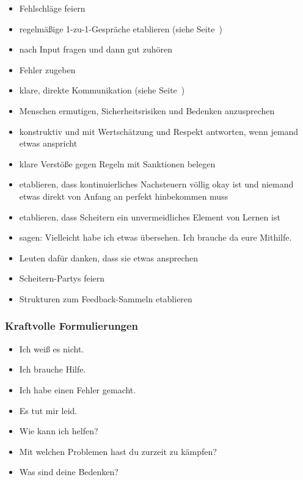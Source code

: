 \begin{itemize}
    \item Fehlschläge feiern 
    \item regelmäßige 1-zu-1-Gespräche etablieren (siehe Seite~\pageref{1-zu-1}) 
    \item nach Input fragen und dann gut zuhören  
    \item Fehler zugeben 
    \item klare, direkte Kommunikation (siehe Seite~\pageref{direkte-kommunikation}) 
    \item Menschen ermutigen, Sicherheitsrisiken und Bedenken anzusprechen
    \item konstruktiv und mit Wertschätzung und Respekt antworten, wenn jemand etwas anspricht  
    \item klare Verstöße gegen Regeln mit Sanktionen belegen  
    \item etablieren, dass kontinuierliches Nachsteuern völlig okay ist und niemand etwas direkt von Anfang an perfekt hinbekommen muss  
    \item etablieren, dass Scheitern ein unvermeidliches Element von Lernen ist 
    \item sagen: \glqq Vielleicht habe ich etwas übersehen. Ich brauche da eure Mithilfe.\grqq {}
    \item Leuten dafür danken, dass sie etwas ansprechen 
    \item Scheitern-Partys feiern 
    \item Strukturen zum Feedback-Sammeln etablieren 
\end{itemize}

\subsubsection{Kraftvolle Formulierungen}

\begin{itemize}
    \item \glqq Ich weiß es nicht.\grqq
    \item \glqq Ich brauche Hilfe.\grqq
    \item \glqq Ich habe einen Fehler gemacht.\grqq {}
    \item \glqq Es tut mir leid.\grqq
    \item \glqq Wie kann ich helfen?\grqq
    \item \glqq Mit welchen Problemen hast du zurzeit zu kämpfen?\grqq
    \item \glqq Was sind deine Bedenken?\grqq
\end{itemize}

